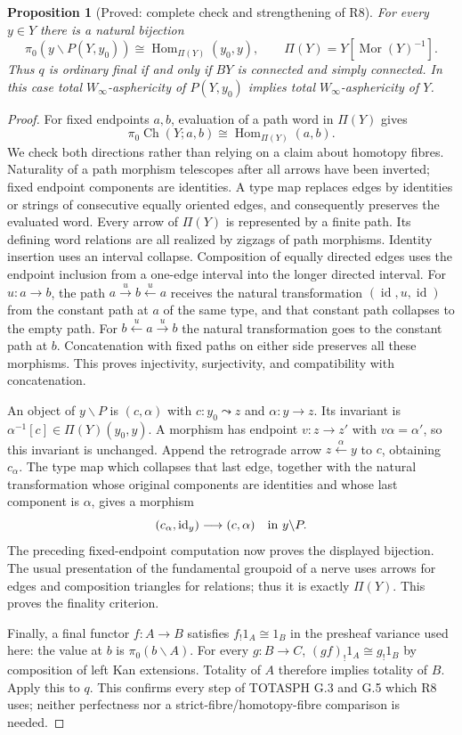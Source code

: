 \documentclass[11pt,a4paper]{article}
\newtheorem{proposition}[theorem]{Proposition}
\theoremstyle{definition}
\theoremstyle{remark}
\begin{document}
\begin{proposition}[Proved: complete check and strengthening of R8]
\label{E:R8}
For every $y\in Y$ there is a natural bijection
\[
\pi_0(y\backslash P(Y,y_0))
 \cong\operatorname{Hom}_{\Pi(Y)}(y_0,y),
\qquad \Pi(Y)=Y[\operatorname{Mor}(Y)^{-1}].
\]
Thus $q$ is ordinary final if and only if $BY$ is connected and simply
connected.  In this case total $W_\infty$-asphericity of $P(Y,y_0)$
implies total $W_\infty$-asphericity of $Y$.
\end{proposition}
\begin{proof}
For fixed endpoints $a,b$, evaluation of a path word in $\Pi(Y)$ gives
\[
\pi_0\operatorname{Ch}(Y;a,b)
 \cong\operatorname{Hom}_{\Pi(Y)}(a,b).
\]
We check both directions rather than relying on a claim about homotopy
fibres.  Naturality of a path morphism telescopes after all arrows have
been inverted; fixed endpoint components are identities.  A type map
replaces edges by identities or strings of consecutive equally oriented
edges, and consequently preserves the evaluated word.  Every arrow of
$\Pi(Y)$ is represented by a finite path.  Its defining word relations
are all realized by zigzags of path morphisms.  Identity insertion uses
an interval collapse.  Composition of equally directed edges uses the
endpoint inclusion from a one-edge interval into the longer directed
interval.  For $u:a\to b$, the path
$a\xrightarrow{u}b\xleftarrow{u}a$ receives the natural
transformation $(\operatorname{id},u,\operatorname{id})$ from the
constant path at $a$ of the same type, and that constant path collapses
to the empty path.  For $b\xleftarrow{u}a\xrightarrow{u}b$ the
natural transformation goes to the constant path at $b$.  Concatenation
with fixed paths on either side preserves all these morphisms.  This
proves injectivity, surjectivity, and compatibility with concatenation.

An object of $y\backslash P$ is $(c,\alpha)$ with
$c:y_0\leadsto z$ and $\alpha:y\to z$.  Its invariant is
$\alpha^{-1}[c]\in\Pi(Y)(y_0,y)$.  A morphism has endpoint
$v:z\to z'$ with $v\alpha=\alpha'$, so this invariant is unchanged.
Append the retrograde arrow $z\xleftarrow{\alpha}y$ to $c$, obtaining
$c_\alpha$.  The type map which collapses that last edge, together with
the natural transformation whose original components are identities
and whose last component is $\alpha$, gives a morphism
\[
(c_\alpha,\operatorname{id}_y)\longrightarrow(c,\alpha)
\quad\hbox{in }y\backslash P.
\]
The preceding fixed-endpoint computation now proves the displayed
bijection.  The usual presentation of the fundamental groupoid of a
nerve uses arrows for edges and composition triangles for relations;
thus it is exactly $\Pi(Y)$.  This proves the finality criterion.

Finally, a final functor $f:A\to B$ satisfies
$f_!1_A\cong1_B$ in the presheaf variance used here: the value at $b$
is $\pi_0(b\backslash A)$.  For every $g:B\to C$,
$(gf)_!1_A\cong g_!1_B$ by composition of left Kan extensions.
Totality of $A$ therefore implies totality of $B$.  Apply this to $q$.
This confirms every step of TOTASPH G.3 and G.5 which R8 uses; neither
perfectness nor a strict-fibre/homotopy-fibre comparison is needed.
\end{proof}
\end{document}
